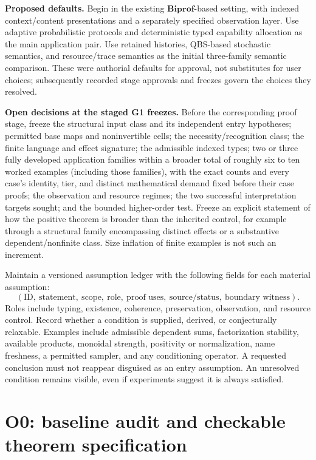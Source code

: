 \documentclass[11pt,a4paper]{article}
\newcommand{\Biprof}{\mathbf{Biprof}}
\begin{document}
\textbf{Proposed defaults.} Begin in the existing \(\Biprof\)-based setting,
with indexed context/content presentations and a separately specified
observation layer. Use adaptive probabilistic protocols and deterministic
typed capability allocation as the main application pair. Use retained
histories, QBS-based stochastic semantics, and resource/trace semantics as
the initial three-family semantic comparison. These were authorial defaults
for approval, not substitutes for user choices; subsequently recorded stage
approvals and freezes govern the choices they resolved.

\textbf{Open decisions at the staged G1 freezes.} Before the corresponding
proof stage, freeze the structural input class and
its independent entry hypotheses; permitted base maps and noninvertible
cells; the necessity/recognition class; the finite language and effect
signature; the admissible indexed types; two or three fully developed
application families within a broader total of roughly six to ten worked
examples (including those families), with the exact counts and every case's
identity, tier, and distinct mathematical demand fixed before their case proofs;
the observation and resource regimes; the two successful interpretation
targets sought; and the bounded higher-order test. Freeze an explicit
statement of how the positive theorem is broader than the inherited control,
for example through a structural family encompassing distinct effects or a
substantive dependent/nonfinite class. Size inflation of finite examples is
not such an increment.

Maintain a versioned assumption ledger with the following fields for each
material assumption:
\[
 (\text{ID},\ \text{statement},\ \text{scope},\ \text{role},\
   \text{proof uses},\ \text{source/status},\ \text{boundary witness}).
\]
Roles include typing, existence, coherence, preservation, observation, and
resource control. Record whether a condition is supplied, derived, or
conjecturally relaxable. Examples include admissible dependent sums,
factorization stability, available products, monoidal strength, positivity or
normalization, name freshness, a permitted sampler, and any conditioning
operator. A requested conclusion must not reappear disguised as an entry
assumption. An unresolved condition remains visible, even if experiments
suggest it is always satisfied.

\section{O0: baseline audit and checkable theorem specification}\label{sec:o0}
\end{document}
